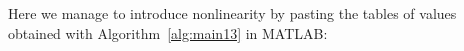 Here we manage to introduce nonlinearity by pasting the tables of values obtained with Algorithm~\ref{alg:main13} in MATLAB:
\begin{figure}[H]
    \centering
    \quad
\end{figure}
